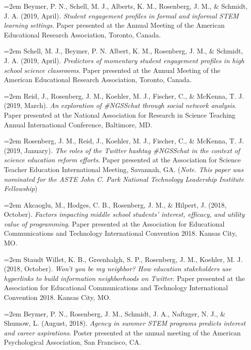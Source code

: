 \documentclass[
  14,
]{article}
\begin{document}
\hangindent=2em Beymer, P. N., Schell, M. J., Alberts, K. M., Rosenberg,
J. M., \& Schmidt, J. A. (2019, April). \emph{Student engagement
profiles in formal and informal STEM learning settings}. Paper presented
at the Annual Meeting of the American Educational Research Association,
Toronto, Canada.

\hangindent=2em Schell, M. J., Beymer, P. N. Albert, K. M., Rosenberg,
J. M., \& Schmidt, J. A. (2019, April). \emph{Predictors of momentary
student engagement profiles in high school science classrooms}. Paper
presented at the Annual Meeting of the American Educational Research
Association, Toronto, Canada.

\hangindent=2em Reid, J., Rosenberg, J. M., Koehler, M. J., Fischer, C.,
\& McKenna, T. J. (2019, March). \emph{An exploration of \#NGSSchat
through social network analysis}. Paper presented at the National
Association for Research in Science Teaching Annual International
Conference, Baltimore, MD.

\hangindent=2em Rosenberg, J. M., Reid, J., Koehler, M. J., Fischer, C.,
\& McKenna, T. J. (2019, January). \emph{The roles of the Twitter
hashtag \#NGSSchat in the context of science education reform efforts}.
Paper presented at the Association for Science Teacher Education
International Meeting, Savannah, GA. (\emph{Note. This paper was
nominated for the ASTE John C. Park National Technology Leadership
Institute Fellowship})

\hangindent=2em Akcaoglu, M., Hodges, C. B., Rosenberg, J. M., \&
Hilpert, J. (2018, October). \emph{Factors impacting middle school
students' interest, efficacy, and utility value of programming}. Paper
presented at the Association for Educational Communications and
Technology International Convention 2018. Kansas City, MO.

\hangindent=2em Staudt Willet, K. B., Greenhalgh, S. P., Rosenberg, J.
M., Koehler, M. J. (2018, October). \emph{Won't you be my neighbor? How
education stakeholders use hyperlinks to build information neighborhoods
on Twitter}. Paper presented at the Association for Educational
Communications and Technology International Convention 2018. Kansas
City, MO.

\hangindent=2em Beymer, P. N., Rosenberg, J. M., Schmidt, J. A.,
Naftzger, N. J., \& Shumow, L. (August, 2018). \emph{Agency in summer
STEM programs predicts interest and career aspirations}. Poster
presented at the annual meeting of the American Psychological
Association, San Francisco, CA.
\end{document}
